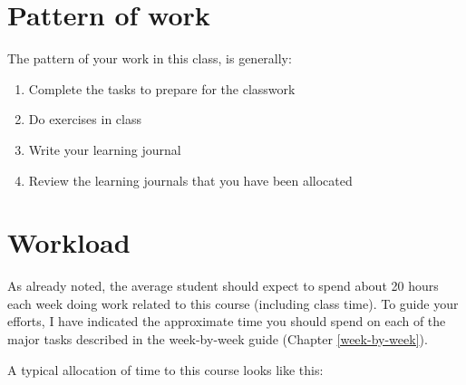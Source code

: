 \documentclass[]{book}
\providecommand{\tightlist}{%
  \setlength{\itemsep}{0pt}\setlength{\parskip}{0pt}}
\theoremstyle{definition}
\theoremstyle{definition}
\theoremstyle{definition}
\theoremstyle{remark}
\begin{document}
\hypertarget{pattern-of-work}{%
\section{Pattern of work}\label{pattern-of-work}}

The pattern of your work in this class, is generally:

\begin{enumerate}
\def\labelenumi{\arabic{enumi}.}
\tightlist
\item
  Complete the tasks to prepare for the classwork
\item
  Do exercises in class
\item
  Write your learning journal
\item
  Review the learning journals that you have been allocated
\end{enumerate}

\hypertarget{workload}{%
\section{Workload}\label{workload}}

As already noted, the average student should expect to spend about 20
hours each week doing work related to this course (including class
time). To guide your efforts, I have indicated the approximate time you
should spend on each of the major tasks described in the week-by-week
guide (Chapter \ref{week-by-week}).

A typical allocation of time to this course looks like this:
\end{document}
